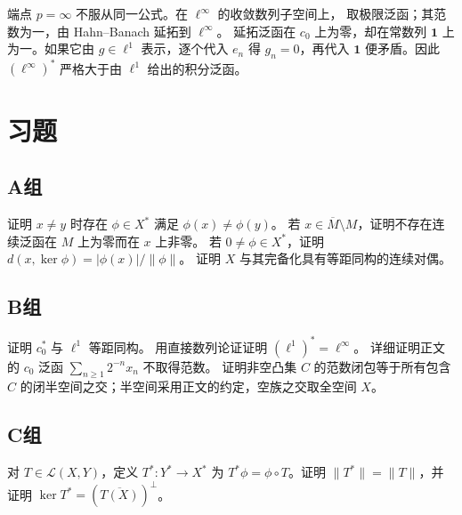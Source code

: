端点 \(p=\infty\) 不服从同一公式。在 \(\ell^\infty\) 的收敛数列子空间上，
取极限泛函；其范数为一，由 Hahn--Banach 延拓到 \(\ell^\infty\)。
延拓泛函在 \(c_0\) 上为零，却在常数列 \(\mathbf1\) 上为一。如果它由
\(g\in\ell^1\) 表示，逐个代入 \(e_n\) 得 \(g_n=0\)，再代入 \(\mathbf1\)
便矛盾。因此 \((\ell^\infty)^*\) 严格大于由 \(\ell^1\) 给出的积分泛函。

\section*{习题}
\subsection*{A组}
\begin{enumerate}[label=\textbf{\thechapter.\arabic*.}]
证明 \(x\ne y\) 时存在 \(\phi\in X^*\) 满足 \(\phi(x)\ne\phi(y)\)。
若 \(x\in\overline M\setminus M\)，证明不存在连续泛函在 \(M\) 上为零而在 \(x\) 上非零。
若 \(0\ne\phi\in X^*\)，证明 \(d(x,\ker\phi)=|\phi(x)|/\|\phi\|\)。
证明 \(X\) 与其完备化具有等距同构的连续对偶。
\end{enumerate}
\subsection*{B组}
\begin{enumerate}[label=\textbf{\thechapter.\arabic*.},resume]
证明 \(c_0^*\) 与 \(\ell^1\) 等距同构。
用直接数列论证证明 \((\ell^1)^*=\ell^\infty\)。
详细证明正文的 \(c_0\) 泛函 \(\sum_{n\ge1}2^{-n}x_n\) 不取得范数。
证明非空凸集 \(C\) 的范数闭包等于所有包含 \(C\) 的闭半空间之交；半空间采用正文的约定，空族之交取全空间 \(X\)。
\end{enumerate}
\subsection*{C组}
\begin{enumerate}[label=\textbf{\thechapter.\arabic*.},resume]
对 \(T\in\mathcal L(X,Y)\)，定义 \(T^*:Y^*\to X^*\) 为 \(T^*\phi=\phi\circ T\)。证明 \(\|T^*\|=\|T\|\)，并证明 \(\ker T^*=(\overline{T(X)})^\perp\)。
\end{enumerate}
